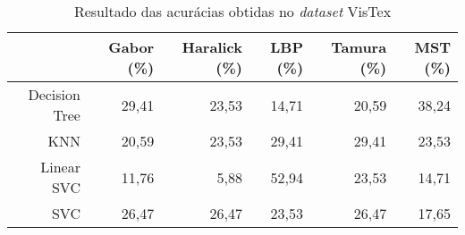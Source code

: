 \begin{table}[H]
    \centering
    \caption[Resultado das acurácias obtidas no VisTex]{Resultado das acurácias obtidas no \textit{dataset} VisTex
    \label{tab:visTexAcuracias}}
    \begin{tabular}{rrrrrr}
        \toprule
            & Gabor (\%) & Haralick (\%) & LBP (\%) & Tamura (\%) & MST (\%) \\
        \midrule
            Decision Tree & 29,41 & 23,53 & 14,71 & 20,59 & 38,24 \\
            KNN & 20,59 & 23,53 & 29,41 & 29,41 & 23,53 \\
            Linear SVC & 11,76 & 5,88 & 52,94 & 23,53 & 14,71 \\
            SVC & 26,47 & 26,47 & 23,53 & 26,47 & 17,65 \\
        \bottomrule
    \end{tabular}
\end{table}
